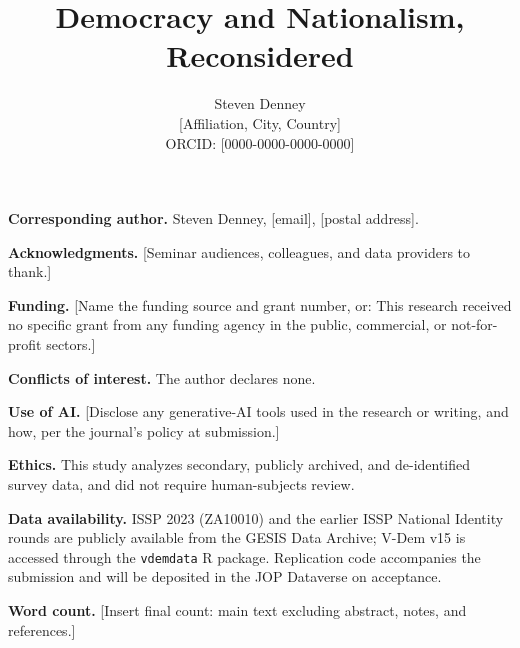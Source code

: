 \documentclass[12pt]{article}
\title{\bfseries Democracy and Nationalism, Reconsidered}
\author{Steven Denney\\[2pt]
\normalsize [Affiliation, City, Country]\\
\normalsize ORCID: [0000-0000-0000-0000]}
\date{}
\begin{document}
\maketitle
\thispagestyle{empty}
\singlespacing

\noindent\textbf{Corresponding author.} Steven Denney, [email], [postal address].

\bigskip
\noindent\textbf{Acknowledgments.} [Seminar audiences, colleagues, and data providers to thank.]

\bigskip
\noindent\textbf{Funding.} [Name the funding source and grant number, or: This research received no specific grant from any funding agency in the public, commercial, or not-for-profit sectors.]

\bigskip
\noindent\textbf{Conflicts of interest.} The author declares none.

\bigskip
\noindent\textbf{Use of AI.} [Disclose any generative-AI tools used in the research or writing, and how, per the journal's policy at submission.]

\bigskip
\noindent\textbf{Ethics.} This study analyzes secondary, publicly archived, and de-identified survey data, and did not require human-subjects review.

\bigskip
\noindent\textbf{Data availability.} ISSP 2023 (ZA10010) and the earlier ISSP National Identity rounds are publicly available from the GESIS Data Archive; V-Dem v15 is accessed through the \texttt{vdemdata} R package. Replication code accompanies the submission and will be deposited in the JOP Dataverse on acceptance.

\bigskip
\noindent\textbf{Word count.} [Insert final count: main text excluding abstract, notes, and references.]
\end{document}
